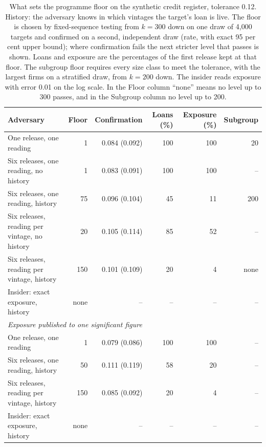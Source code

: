 \begin{table}[t]
\centering
\caption{What sets the programme floor on the synthetic credit register, tolerance 0.12. History: the adversary knows in which vintages the target's loan is live. The floor is chosen by fixed-sequence testing from $k=300$ down on one draw of 4{,}000 targets and confirmed on a second, independent draw (rate, with exact 95 per cent upper bound); where confirmation fails the next stricter level that passes is shown. Loans and exposure are the percentages of the first release kept at that floor. The subgroup floor requires every size class to meet the tolerance, with the largest firms on a stratified draw, from $k=200$ down. The insider reads exposure with error 0.01 on the log scale. In the Floor column ``none'' means no level up to 300 passes, and in the Subgroup column no level up to 200.}
\label{tab:robust}
\small\setlength{\tabcolsep}{3pt}
\begin{tabular}{lrrrrr}
\toprule
Adversary & Floor & Confirmation & Loans (\%) & Exposure (\%) & Subgroup \\
\midrule
One release, one reading & 1 & 0.084 (0.092) & 100 & 100 & 20 \\
Six releases, one reading, no history & 1 & 0.083 (0.091) & 100 & 100 & -- \\
Six releases, one reading, history & 75 & 0.096 (0.104) & 45 & 11 & 200 \\
Six releases, reading per vintage, no history & 20 & 0.105 (0.114) & 85 & 52 & -- \\
Six releases, reading per vintage, history & 150 & 0.101 (0.109) & 20 & 4 & none \\
Insider: exact exposure, history & none & -- & -- & -- & -- \\
\midrule
\multicolumn{6}{l}{\emph{Exposure published to one significant figure}}\\
One release, one reading & 1 & 0.079 (0.086) & 100 & 100 & -- \\
Six releases, one reading, history & 50 & 0.111 (0.119) & 58 & 20 & -- \\
Six releases, reading per vintage, history & 150 & 0.085 (0.092) & 20 & 4 & -- \\
Insider: exact exposure, history & none & -- & -- & -- & -- \\
\bottomrule
\end{tabular}
\end{table}
